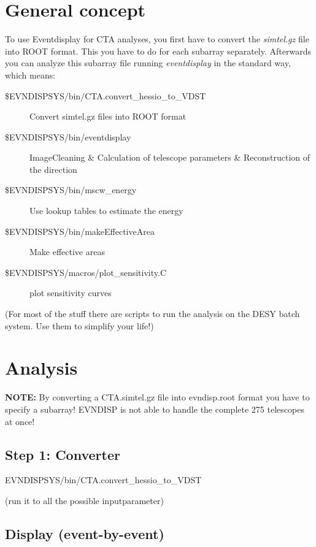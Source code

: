 \documentclass[titlepage,a4paper,twoside,11pt]{report}
\begin{document}
\section{General concept}

To use Eventdisplay for CTA analyses, you first have to convert the {\it simtel.gz} file into ROOT format. 
This you have to do for each subarray separately.
Afterwards you can analyze this subarray file running {\it eventdisplay} in the standard way, which means:

\begin{description}
\item[\$EVNDISPSYS/bin/CTA.convert\_hessio\_to\_VDST]
        Convert simtel.gz files into ROOT format

\item[\$EVNDISPSYS/bin/eventdisplay]
	ImageCleaning \& Calculation of telescope parameters \& Reconstruction of the direction

\item[\$EVNDISPSYS/bin/mscw\_energy]
        Use lookup tables to estimate the energy

\item[\$EVNDISPSYS/bin/makeEffectiveArea]
        Make effective areas

\item[\$EVNDISPSYS/macros/plot\_sensitivity.C]
        plot sensitivity curves
\end{description}

(For most of the stuff there are scripts to run the analysis on the DESY batch system. Use them to simplify your life!)

\section{Analysis}

{\bf NOTE:}
By converting a CTA.simtel.gz file into evndisp.root format you have to specify a subarray!
EVNDISP is not able to handle the complete 275 telescopes at once!

\subsection{Step 1: Converter}

EVNDISPSYS/bin/CTA.convert\_hessio\_to\_VDST

(run it to all the possible inputparameter)

\subsection{Display (event-by-event)}
\end{document}
